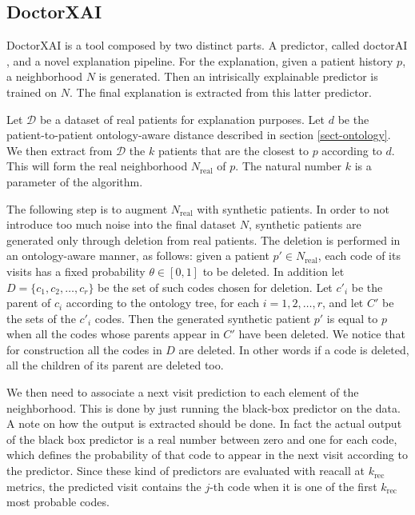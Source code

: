 \documentclass[]{marticle}
\newcommand{\ds}{\mathcal{D}}
\begin{document}
\subsection{DoctorXAI} \label{sect-drxai}

DoctorXAI \cite{panigutti-xai} is a tool composed by two distinct parts. A predictor, called
doctorAI \cite{paper-doctor-ai}, and a novel explanation pipeline. For the explanation, given a
patient history $p$, a neighborhood $N$ is generated. Then an intrisically explainable predictor is
trained on $N$. The final explanation is extracted from this latter predictor.

\newcommand{\realds}{N_\text{real}}

Let $\ds$ be a dataset of real patients for explanation purposes. Let $d$ be the patient-to-patient
ontology-aware distance described in section \ref{sect-ontology}. We then extract from $\ds$ the $k$
patients that are the closest to $p$ according to $d$. This will form the real neighborhood
$\realds$ of $p$. The natural number $k$ is a parameter of the algorithm.

The following step is to augment $\realds$ with synthetic patients. In order to not introduce too
much noise into the final dataset $N$, synthetic patients are generated only through deletion from
real patients. The deletion is performed in an ontology-aware manner, as follows: given a patient
$p'\in \realds$, each code of its visits has a fixed probability $\theta\in [0,1]$ to be deleted. In
addition let $D=\{c_1, c_2, \dots, c_r\}$ be the set of such codes chosen for deletion. Let $c'_i$
be the parent of $c_i$ according to the ontology tree, for each $i=1,2,\dots,r$, and let $C'$ be the
sets of the $c'_i$ codes. Then the generated synthetic patient $p'$ is equal to $p$ when all the
codes whose parents appear in $C'$ have been deleted. We notice that for construction all the codes
in $D$ are deleted. In other words if a code is deleted, all the children of its parent are deleted
too.

We then need to associate a next visit prediction to each element of the neighborhood. This is done
by just running the black-box predictor on the data. A note on how the output is extracted should be
done. In fact the actual output of the black box predictor is a real number between zero and one for
each code, which defines the probability of that code to appear in the next visit according to the
predictor. Since these kind of predictors are evaluated with reacall at $k_\text{rec}$ metrics, the
predicted visit contains the $j$-th code when it is one of the first $k_\text{rec}$ most probable
codes. 
\end{document}
